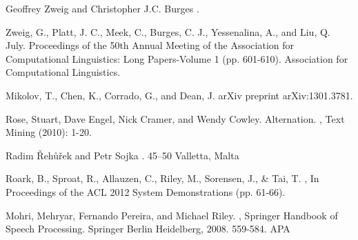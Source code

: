 \documentclass[11pt]{article}
\begin{document}
\begin{thebibliography}{}

Geoffrey Zweig and Christopher J.C. Burges
.

Zweig, G., Platt, J. C., Meek, C., Burges, C. J., Yessenalina, A., and Liu, Q. 
 July.
\newblock Proceedings of the 50th Annual Meeting of the Association for Computational Linguistics: Long Papers-Volume 1 (pp. 601-610). Association for Computational Linguistics.

Mikolov, T., Chen, K., Corrado, G., and Dean, J.
\newblock arXiv preprint arXiv:1301.3781.

Rose, Stuart, Dave Engel, Nick Cramer, and Wendy Cowley.
\newblock Alternation.
,
\newblock Text Mining (2010): 1-20.

Radim {\v R}eh{\r u}{\v r}ek and Petr Sojka
. 45--50
\newblock Valletta, Malta

Roark, B., Sproat, R., Allauzen, C., Riley, M., Sorensen, J., \& Tai, T.
,
\newblock  In Proceedings of the ACL 2012 System Demonstrations (pp. 61-66).

Mohri, Mehryar, Fernando Pereira, and Michael Riley. 
,
\newblock Springer Handbook of Speech Processing. Springer Berlin Heidelberg, 2008. 559-584. APA

\end{thebibliography}
\end{document}
